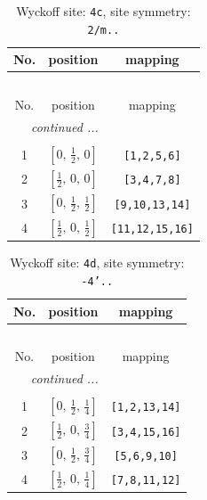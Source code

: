\documentclass[fleqn,8pt]{jsarticle}
\begin{document}
\renewcommand{\arraystretch}{1.2}
\begin{longtable}{ccc}
\caption{Wyckoff site: {\tt 4c}, site symmetry: {\tt 2/m..}}
 \\
 \hline \hline
No. & position & mapping \\ \hline \endfirsthead

\multicolumn{2}{l}{\tablename\ \thetable{}} \\
 \hline \hline
No. & position & mapping \\ \hline \endhead

 \hline \hline
\multicolumn{2}{r}{\footnotesize\it continued ...} \\ \endfoot

 \hline \hline
\multicolumn{2}{r}{} \\ \endlastfoot

1 & $\left[ 0,\, \frac{1}{2},\, 0 \right]$ & {\tt [1,2,5,6]} \\ \hline
2 & $\left[ \frac{1}{2},\, 0,\, 0 \right]$ & {\tt [3,4,7,8]} \\ \hline
3 & $\left[ 0,\, \frac{1}{2},\, \frac{1}{2} \right]$ & {\tt [9,10,13,14]} \\ \hline
4 & $\left[ \frac{1}{2},\, 0,\, \frac{1}{2} \right]$ & {\tt [11,12,15,16]} \\
\end{longtable}
\renewcommand{\arraystretch}{1.2}
\begin{longtable}{ccc}
\caption{Wyckoff site: {\tt 4d}, site symmetry: {\tt -4'..}}
 \\
 \hline \hline
No. & position & mapping \\ \hline \endfirsthead

\multicolumn{2}{l}{\tablename\ \thetable{}} \\
 \hline \hline
No. & position & mapping \\ \hline \endhead

 \hline \hline
\multicolumn{2}{r}{\footnotesize\it continued ...} \\ \endfoot

 \hline \hline
\multicolumn{2}{r}{} \\ \endlastfoot

1 & $\left[ 0,\, \frac{1}{2},\, \frac{1}{4} \right]$ & {\tt [1,2,13,14]} \\ \hline
2 & $\left[ \frac{1}{2},\, 0,\, \frac{3}{4} \right]$ & {\tt [3,4,15,16]} \\ \hline
3 & $\left[ 0,\, \frac{1}{2},\, \frac{3}{4} \right]$ & {\tt [5,6,9,10]} \\ \hline
4 & $\left[ \frac{1}{2},\, 0,\, \frac{1}{4} \right]$ & {\tt [7,8,11,12]} \\
\end{longtable}
\end{document}
